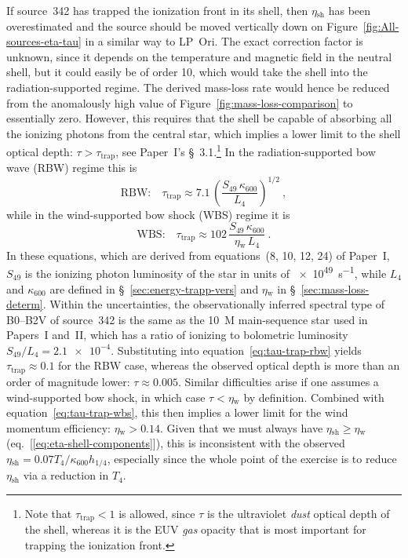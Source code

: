 \documentclass[useAMS, usenatbib, a4paper]{mnras}
\newcommand{\wind}{\ensuremath{_{\text{w}}}}
\newcommand\shell{\ensuremath{_{\text{sh}}}}
\newcommand\iftrap{\ensuremath{_{\text{trap}}}}
\begin{document}
If source~342 has trapped the ionization front in its shell, then
\(\eta\shell\) has been overestimated and the source should be moved
vertically down on Figure~\ref{fig:All-sources-eta-tau} in a similar
way to LP~Ori.  The exact correction factor is unknown, since it
depends on the temperature and magnetic field in the neutral shell,
but it could easily be of order 10, which would take the shell into
the radiation-supported regime.  The derived mass-loss rate would
hence be reduced from the anomalously high value of
Figure~\ref{fig:mass-loss-comparison} to essentially zero.  However,
this requires that the shell be capable of absorbing all the ionizing
photons from the central star, which implies a lower limit to the
shell optical depth: \(\tau > \tau\iftrap\), see Paper~I's
\S~3.1.\footnote{%
  Note that \(\tau\iftrap < 1\) is allowed, since \(\tau\) is the
  ultraviolet \emph{dust} optical depth of the shell, whereas it is
  the EUV \textit{gas} opacity that is most important for trapping the
  ionization front.  } %
In the radiation-supported bow wave (RBW) regime this is
\begin{equation}
  \label{eq:tau-trap-rbw}
  \text{RBW:}\quad \tau\iftrap \approx 7.1 \, \left( \frac{S_{49} \, \kappa_{600}}{L_4} \right)^{1/2} \ ,
\end{equation}
while in the wind-supported bow shock (WBS) regime it is
\begin{equation}
  \label{eq:tau-trap-wbs}
  \text{WBS:}\quad \tau\iftrap \approx 102 \, \frac{S_{49} \, \kappa_{600}}{\eta\wind\, L_4}  \ .
\end{equation}
In these equations, which are derived from equations~(8, 10, 12, 24)
of Paper~I, \(S_{49}\) is the ionizing photon luminosity of the star
in units of \SI{e49}{s^{-1}}, while \(L_4\) and \(\kappa_{600}\) are
defined in \S~\ref{sec:energy-trapp-vers} and \(\eta\wind\) in
\S~\ref{sec:mass-loss-determ}.  Within the uncertainties, the
observationally inferred spectral type of B0--B2V of source~342 is the
same as the \SI{10}{M_\odot} main-sequence star used in Papers~I
and~II, which has a ratio of ionizing to bolometric luminosity
\(S_{49}/L_4 = \num{2.1e-4}\).  Substituting into
equation~\eqref{eq:tau-trap-rbw} yields \(\tau\iftrap \approx 0.1 \)
for the RBW case, whereas the observed optical depth is more than an
order of magnitude lower: \(\tau \approx 0.005\).  Similar
difficulties arise if one assumes a wind-supported bow shock, in which
case \(\tau < \eta\wind\) by definition.  Combined with
equation~\eqref{eq:tau-trap-wbs}, this then implies a lower limit for
the wind momentum efficiency: \(\eta\wind > 0.14\).  Given that we
must always have \(\eta\shell \ge \eta\wind\)
(eq.~[\ref{eq:eta-shell-components}]), this is inconsistent with the
observed \(\eta\shell = 0.07 T_4 / \kappa_{600} h_{1/4}\), especially
since the whole point of the exercise is to reduce \(\eta\shell\) via
a reduction in \(T_4\).
\end{document}
